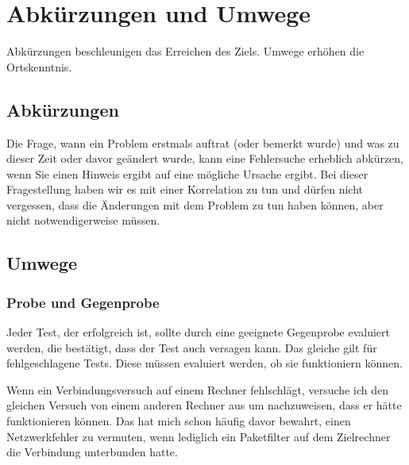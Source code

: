 \section{Abkürzungen und Umwege}
\label{sec:abkuerzung-umweg}

\begin{abstractsec}
  Abkürzungen beschleunigen das Erreichen des Ziels. Umwege erhöhen die
  Ortskenntnis.
\end{abstractsec}

\begin{normaltext}

\subsection*{Abkürzungen}
\label{sec:abkuerzungen}

Die Frage, wann ein Problem erstmals auftrat (oder bemerkt wurde) und was zu
dieser Zeit oder davor geändert wurde, kann eine Fehlersuche erheblich
abkürzen, wenn Sie einen Hinweis ergibt auf eine mögliche Ursache ergibt. Bei
dieser Fragestellung haben wir es mit einer Korrelation zu tun und dürfen
nicht vergessen, dass die Änderungen mit dem Problem zu tun haben können, aber
nicht notwendigerweise müssen.

\subsection*{Umwege}
\label{sec:umwege}

\subsubsection{Probe und Gegenprobe}

Jeder Test, der erfolgreich ist, sollte durch eine geeignete Gegenprobe
evaluiert werden, die bestätigt, dass der Test auch versagen kann. Das gleiche
gilt für fehlgeschlagene Tests. Diese müssen evaluiert werden, ob sie
funktioniern können.

Wenn ein Verbindungsversuch auf einem Rechner fehlschlägt, versuche ich den
gleichen Versuch von einem anderen Rechner aus um nachzuweisen, dass er hätte
funktionieren können. Das hat mich schon häufig davor bewahrt, einen
Netzwerkfehler zu vermuten, wenn lediglich ein Paketfilter auf dem Zielrechner
die Verbindung unterbunden hatte.
\end{normaltext}


